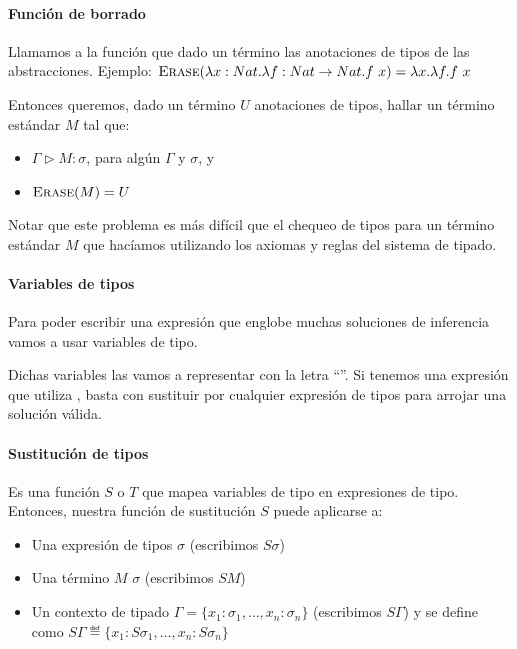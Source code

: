 \paragraph{Función de borrado}

Llamamos \erase{\cdot} a la función que dado un término  las anotaciones de tipos de las abstracciones. Ejemplo: $\textsc{Erase}(\lambda x:Nat.\lambda f:Nat\to Nat.f\ x) = \lambda x.\lambda f.f\ x$

Entonces queremos, dado un término $U$  anotaciones de tipos, hallar un término estándar $M$ tal que:
\begin{itemize}
  \item $\Gamma \rhd M : \sigma$, para algún $\Gamma$ y $\sigma$, y
  \item $\textsc{Erase}(M) = U$
\end{itemize}

Notar que este problema es más difícil que el chequeo de tipos para un término estándar $M$ que hacíamos utilizando los axiomas y reglas del sistema de tipado.

\paragraph{Variables de tipos}

Para poder escribir una  expresión que englobe muchas soluciones de inferencia vamos a usar variables de tipo.

Dichas variables las vamos a representar con la letra ``''. Si tenemos una expresión que utiliza , basta con sustituir  por cualquier expresión de tipos para arrojar una solución válida.

\paragraph{Sustitución de tipos}

Es una función $S$ o $T$ que mapea variables de tipo en expresiones de tipo. Entonces, nuestra función de sustitución $S$ puede aplicarse a:
\begin{itemize}
  \item Una expresión de tipos $\sigma$ (escribimos $S\sigma$)
  \item Una término $M$ $\sigma$ (escribimos $SM$)
  \item Un contexto de tipado  $\Gamma = \{x_1:\sigma_1,\dots,x_n:\sigma_n\}$ (escribimos $S\Gamma$) y se define como $S\Gamma \eqdef \{x_1:S\sigma_1,\dots,x_n:S\sigma_n\}$
\end{itemize}

